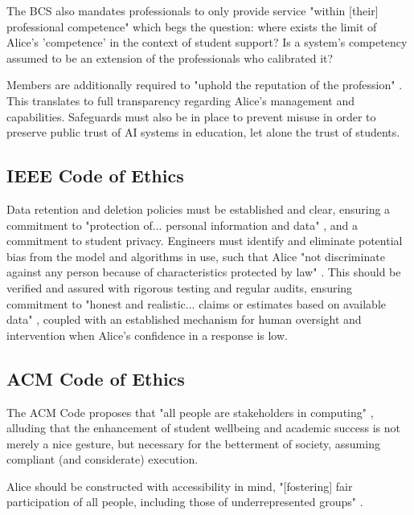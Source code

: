 \documentclass[14pt,a4paper]{article}
\begin{document}
\begin{multicols}{2}
The BCS also mandates professionals to only provide service "within [their] professional competence" \textit{\parencite[p. 2]{BCS2024}} which begs the question: where exists the limit of Alice's 'competence' in the context of student support? Is a system's competency assumed to be an extension of the professionals who calibrated it?

Members are additionally required to "uphold the reputation of the profession" \textit{\parencite[p. 3]{BCS2024}}. This translates to full transparency regarding Alice's management and capabilities. Safeguards must also be in place to prevent misuse in order to preserve public trust of AI systems in education, let alone the trust of students.

\subsection{IEEE Code of Ethics}


Data retention and deletion policies must be established and clear, ensuring a commitment to "protection of... personal information and data" \textit{\parencite[p. 1]{IEEE2024}}, and a commitment to student privacy.
Engineers must identify and eliminate potential bias from the model and algorithms in use, such that Alice "not discriminate against any person because of characteristics protected by law" \textit{\parencite[p. 1]{IEEE2024}}.
This should be verified and assured with rigorous testing and regular audits, ensuring commitment to "honest and realistic... claims or estimates based on available data" \textit{\parencite[p. 2]{IEEE2024}}, coupled with an established mechanism for human oversight and intervention when Alice's confidence in a response is low.

\subsection{ACM Code of Ethics}

The ACM Code proposes that "all people are stakeholders in computing" \textit{\parencite[p. 1]{ACM2024}}, alluding that the enhancement of student wellbeing and academic success is not merely a nice gesture, but necessary for the betterment of society, assuming compliant (and considerate) execution.


Alice should be constructed with accessibility in mind, "[fostering] fair participation of all people, including those of underrepresented groups" \textit{\parencite[p. 2]{ACM2024}}.


\end{multicols}
\end{document}
